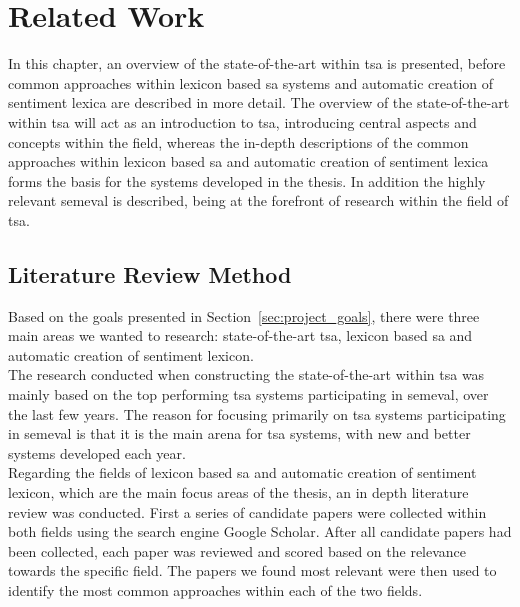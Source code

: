 \chapter{Related Work}
\label{cha:related_work}
In this chapter, an overview of the state-of-the-art within \ac{tsa} is presented, before common approaches within lexicon based \ac{sa} systems and automatic creation of sentiment lexica are described in more detail. The overview of the state-of-the-art within \ac{tsa} will act as an introduction to \ac{tsa}, introducing central aspects and concepts within the field, whereas the in-depth descriptions of the common approaches within lexicon based \ac{sa} and automatic creation of sentiment lexica forms the basis for the systems developed in the thesis. In addition the highly relevant \ac{semeval} is described, being at the forefront of research within the field of \ac{tsa}.

\section{Literature Review Method}
\label{sec:literature_review_method}
Based on the goals presented in Section~\ref{sec:project_goals}, there were three main areas we wanted to research: state-of-the-art \ac{tsa}, lexicon based \ac{sa} and automatic creation of sentiment lexicon.\\

The research conducted when constructing the state-of-the-art within \ac{tsa} was mainly based on the top performing \ac{tsa} systems participating in \ac{semeval}, over the last few years. The reason for focusing primarily on \ac{tsa} systems participating in \ac{semeval} is that it is the main arena for \ac{tsa} systems, with new and better systems developed each year. \\  

Regarding the fields of lexicon based \ac{sa} and automatic creation of sentiment lexicon, which are the main focus areas of the thesis, an in depth literature review was conducted. First a series of candidate papers were collected within both fields using the search engine Google Scholar. After all candidate papers had been collected, each paper was reviewed and scored based on the relevance towards the specific field. The papers we found most relevant were then used to identify the most common approaches within each of the two fields.


